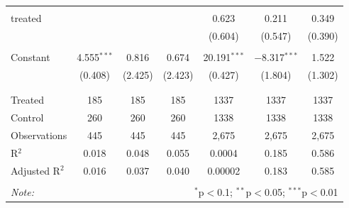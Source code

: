 \begin{table}[!htbp]
\begin{tabular}{@{\extracolsep{5pt}}lcccccc}
  & & & & & & \\ 
 treated &  &  &  & 0.623 & 0.211 & 0.349 \\ 
  &  &  &  & (0.604) & (0.547) & (0.390) \\ 
  & & & & & & \\ 
 Constant & 4.555$^{***}$ & 0.816 & 0.674 & 20.191$^{***}$ & $-$8.317$^{***}$ & 1.522 \\ 
  & (0.408) & (2.425) & (2.423) & (0.427) & (1.804) & (1.302) \\ 
  & & & & & & \\ 
\hline \\[-1.8ex] 
Treated & 185 & 185 & 185 & 1337 & 1337 & 1337 \\ 
Control & 260 & 260 & 260 & 1338 & 1338 & 1338 \\ 
Observations & 445 & 445 & 445 & 2,675 & 2,675 & 2,675 \\ 
R$^{2}$ & 0.018 & 0.048 & 0.055 & 0.0004 & 0.185 & 0.586 \\ 
Adjusted R$^{2}$ & 0.016 & 0.037 & 0.040 & 0.00002 & 0.183 & 0.585 \\ 
\hline 
\hline \\[-1.8ex] 
\textit{Note:}  & \multicolumn{6}{r}{$^{*}$p$<$0.1; $^{**}$p$<$0.05; $^{***}$p$<$0.01} \\ 
\end{tabular} 
\end{table} 
